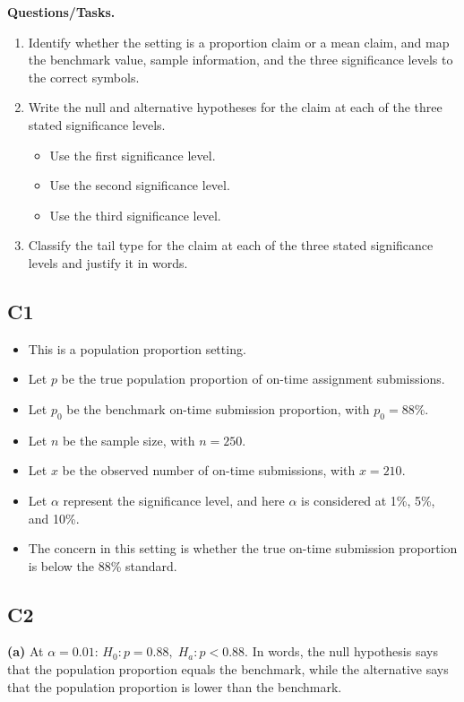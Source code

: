\begin{ExamProblems}
		\textbf{Questions/Tasks.}
		\begin{enumerate}
			\item[(C1)] Identify whether the setting is a proportion claim or a mean claim, and map the benchmark value, sample information, and the three significance levels to the correct symbols.
			\item[(C2)] Write the null and alternative hypotheses for the claim at each of the three stated significance levels.
			\begin{itemize}
				\item[(a)] Use the first significance level.
				\item[(b)] Use the second significance level.
				\item[(c)] Use the third significance level.
			\end{itemize}
			\item[(C3)] Classify the tail type for the claim at each of the three stated significance levels and justify it in words.
		\end{enumerate}
		
		\subsection*{C1}
		\begin{itemize}
			\item This is a population proportion setting.
			\item Let \(p\) be the true population proportion of on-time assignment submissions.
			\item Let \(p_0\) be the benchmark on-time submission proportion, with \(p_0=88\%\).
			\item Let \(n\) be the sample size, with \(n=250\).
			\item Let \(x\) be the observed number of on-time submissions, with \(x=210\).
			\item Let \(\alpha\) represent the significance level, and here \(\alpha\) is considered at 1\%, 5\%, and 10\%.
			\item The concern in this setting is whether the true on-time submission proportion is below the 88\% standard.
		\end{itemize}
		
		\subsection*{C2}
		\textbf{(a)} At \(\alpha=0.01\): \(H_0\colon p=0.88,\; H_a\colon p<0.88\). In words, the null hypothesis says that the population proportion equals the benchmark, while the alternative says that the population proportion is lower than the benchmark.
		

\end{ExamProblems}
